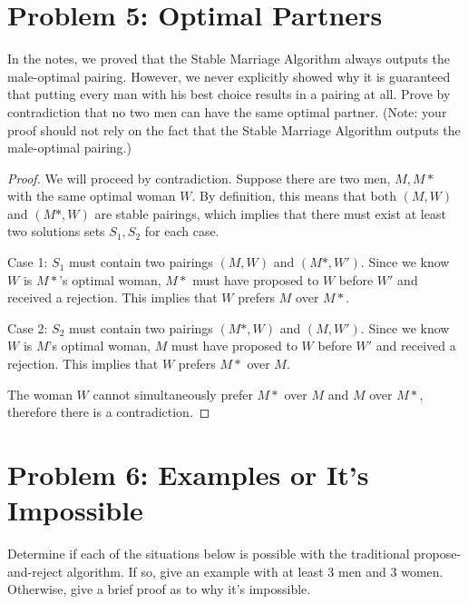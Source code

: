 \documentclass[11pt, notitlepage]{report}
\begin{document}
\newpage
\section{Problem 5: Optimal Partners}

In the notes, we proved that the Stable Marriage Algorithm always outputs the male-optimal pairing.  However, we never explicitly showed why it is guaranteed that putting every man with his best choice results in a pairing at all.  Prove by contradiction that no two men can have the same optimal partner.  (Note: your proof should not rely on the fact that the Stable Marriage Algorithm outputs the male-optimal pairing.)

\begin{proof}We will proceed by contradiction.
	Suppose there are two men, $M, M*$ with the same optimal woman $W$. By definition, this means that both $(M, W)$ and $(M*,W)$ are stable pairings, which implies that there must exist at least two solutions sets $S_1, S_2$ for each case.
	
	Case 1: $S_1$ must contain two pairings $(M, W)$ and $( M*,W' )$. Since we know $W$ is $M*$'s optimal woman, $M*$ must have proposed to $W$ before $W'$ and received a rejection. This implies that $W$ prefers $M$ over $M*$. 
	
	Case 2: $S_2$ must contain two pairings $(M*, W)$ and $( M, W' )$. Since we know $W$ is $M$'s optimal woman, $M$ must have proposed to $W$ before $W'$ and received a rejection. This implies that $W$ prefers $M*$ over $M$.  
	
	The woman $W$ cannot simultaneously prefer $M*$ over $M$ and $M$ over $M*$, therefore there is a contradiction.

\end{proof}

\newpage
\section{Problem 6: Examples or It's Impossible}
Determine if each of the situations below is possible with the traditional propose-and-reject algorithm.
If so, give an example with at least $3$ men and $3$ women. Otherwise, give a brief proof as to why it's impossible.
\end{document}
